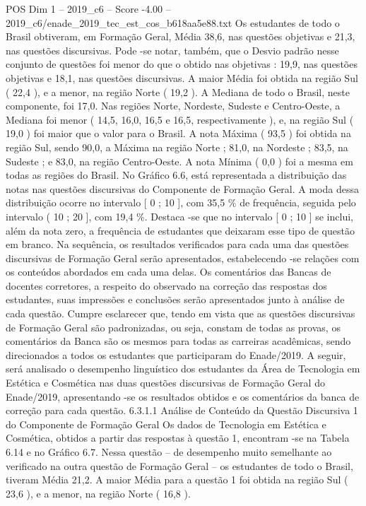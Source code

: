 \begin{textsample}{POS Dim 1 – 2019\_c6 – Score -4.00 – 2019\_c6/enade\_2019\_tec\_est\_cos\_b618aa5e88.txt}
Os estudantes de todo o Brasil obtiveram, em Formação Geral, Média 38,6, nas questões objetivas e 21,3, nas questões discursivas.
Pode -se notar, também, que o Desvio padrão nesse conjunto de questões foi menor do que o obtido nas objetivas : 19,9, nas questões objetivas e 18,1, nas questões discursivas.
A maior Média foi obtida na região Sul ( 22,4 ), e a menor, na região Norte ( 19,2 ).
A Mediana de todo o Brasil, neste componente, foi 17,0.
Nas regiões Norte, Nordeste, Sudeste e Centro-Oeste, a Mediana foi menor ( 14,5, 16,0, 16,5 e 16,5, respectivamente ), e, na região Sul ( 19,0 ) foi maior que o valor para o Brasil.
A nota Máxima ( 93,5 ) foi obtida na região Sul, sendo 90,0, a Máxima na região Norte ; 81,0, na Nordeste ; 83,5, na Sudeste ; e 83,0, na região Centro-Oeste.
A nota Mínima ( 0,0 ) foi a mesma em todas as regiões do Brasil.
No Gráfico 6.6, está representada a distribuição das notas nas questões discursivas do Componente de Formação Geral.
A moda dessa distribuição ocorre no intervalo [ 0 ; 10 ], com 35,5 \% de frequência, seguida pelo intervalo ( 10 ; 20 ], com 19,4 \%.
Destaca -se que no intervalo [ 0 ; 10 ] se inclui, além da nota zero, a frequência de estudantes que deixaram esse tipo de questão em branco.
Na sequência, os resultados verificados para cada uma das questões discursivas de Formação Geral serão apresentados, estabelecendo -se relações com os conteúdos abordados em cada uma delas.
Os comentários das Bancas de docentes corretores, a respeito do observado na correção das respostas dos estudantes, suas impressões e conclusões serão apresentados junto à análise de cada questão.
Cumpre esclarecer que, tendo em vista que as questões discursivas de Formação Geral são padronizadas, ou seja, constam de todas as provas, os comentários da Banca são os mesmos para todas as carreiras acadêmicas, sendo direcionados a todos os estudantes que participaram do Enade/2019.
A seguir, será analisado o desempenho linguístico dos estudantes da Área de Tecnologia em Estética e Cosmética nas duas questões discursivas de Formação Geral do Enade/2019, apresentando -se os resultados obtidos e os comentários da banca de correção para cada questão. 6.3.1.1 Análise de Conteúdo da Questão Discursiva 1 do Componente de Formação Geral Os dados de Tecnologia em Estética e Cosmética, obtidos a partir das respostas à questão 1, encontram -se na Tabela 6.14 e no Gráfico 6.7.
Nessa questão – de desempenho muito semelhante ao verificado na outra questão de Formação Geral – os estudantes de todo o Brasil, tiveram Média 21,2.
A maior Média para a questão 1 foi obtida na região Sul ( 23,6 ), e a menor, na região Norte ( 16,8 ).

\end{textsample}
